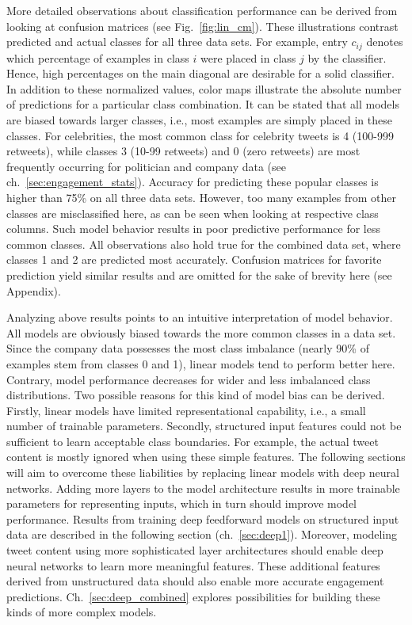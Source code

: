 More detailed observations about classification performance can be derived from
looking at confusion matrices (see Fig.~\ref{fig:lin_cm}).
These illustrations contrast predicted and actual classes for all three data sets.
For example, entry $c_{ij}$ denotes which percentage of examples in class $i$
were placed in class $j$ by the classifier.
Hence, high percentages on the main diagonal are desirable for a solid classifier.
In addition to these normalized values, color maps illustrate the absolute
number of predictions for a particular class combination.
It can be stated that all models are biased towards larger classes, i.e.,
most examples are simply placed in these classes.
For celebrities, the most common class for celebrity tweets is 4 (100-999 retweets), while classes
3 (10-99 retweets) and 0 (zero retweets) are most frequently occurring for politician and company data
(see ch.~\ref{sec:engagement_stats}).
Accuracy for predicting these popular classes is higher than 75\% on all three data sets.
However, too many examples from other classes are misclassified here, as can be
seen when looking at respective class columns.
Such model behavior results in poor predictive performance for less common classes.
All observations also hold true for the combined data set, where classes 1 and 2
are predicted most accurately.
Confusion matrices for favorite prediction yield similar results and are
omitted for the sake of brevity here (see Appendix).

Analyzing above results points to an intuitive interpretation of model behavior.
All models are obviously biased towards the more common classes in a data set.
Since the company data possesses the most class imbalance (nearly 90\% of examples
stem from classes 0 and 1), linear models tend to perform better here.
Contrary, model performance decreases for wider and less imbalanced class distributions.
Two possible reasons for this kind of model bias can be derived.
Firstly, linear models have limited representational capability, i.e., a small
number of trainable parameters.
Secondly, structured input features could not be sufficient to learn acceptable
class boundaries.
For example, the actual tweet content is mostly ignored when using these simple
features.
The following sections will aim to overcome these liabilities by replacing
linear models with deep neural networks.
Adding more layers to the model architecture results in more trainable parameters
for representing inputs, which in turn should improve
model performance.
Results from training deep feedforward models on structured input data are
described in the following section (ch.~\ref{sec:deep1}).
Moreover, modeling tweet content using more sophisticated layer architectures
should enable deep neural networks to learn more meaningful features.
These additional features derived from unstructured data should also enable
more accurate engagement predictions.
Ch.~\ref{sec:deep_combined} explores possibilities for building these kinds
of more complex models.
